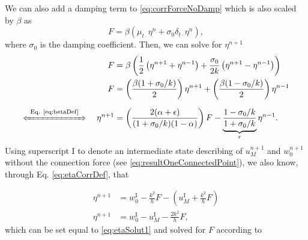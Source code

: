 We can also add a damping term to \eqref{eq:corrForceNoDamp} which is also scaled by $\beta$ as
\begin{equation}\label{eq:corrForce}
    F = \beta \left(\mu_{t\cdot}\eta^n +\sigma_0\delta_{t\cdot}\eta^n \right),
\end{equation}
where $\sigma_0$ is the damping coefficient. Then, we can solve for $\eta^{n+1}$ 
\begin{align}
    F &= \beta\left(\frac{1}{2}\left(\eta^{n+1}+\eta^{n-1}\right) + \frac{\sigma_0}{2k}\left(\eta^{n+1}-\eta^{n-1}\right)\right)\nonumber\\
    F&= \left(\frac{\beta (1 + \sigma_0/k)}{2}\right)\eta^{n+1} + \left(\frac{\beta (1 - \sigma_0/k)}{2}\right) \eta^{n-1}\nonumber\\
    \xLeftrightarrow{\mystrut\ \text{Eq. \eqref{eq:betaDef}}\ } \quad \eta^{n+1} &= \left(\frac{2
    \alfPlusEps}{(1+\sigma_0/k)(1-\alpha)}\right)F - \underbrace{\frac{1-\sigma_0/k}{1+\sigma_0/k}}_{r}\eta^{n-1}.\label{eq:etaSolut1}
\end{align}
Using superscript $\text{I}$ to denote an intermediate state describing of $u^{n+1}_M$ and $w^{n+1}_0$ without the connection force (see \eqref{eq:resultOneConnectedPoint}), we also know, through Eq. \eqref{eq:etaCorrDef}, that 

\begin{align}
    \eta^{n+1} &= w_0^\text{I}-\frac{k^2}{h}F-\left(u_M^\text{I}+\frac{k^2}{h}F\right)\nonumber\\
    \eta^{n+1} &= w_0^\text{I} - u_M^\text{I} - \frac{2k^2}{h}F,\label{eq:etaNext}
\end{align}
which can be set equal to \eqref{eq:etaSolut1} and solved for $F$ according to 

